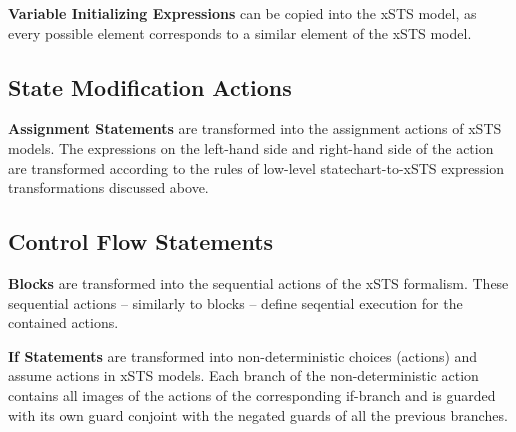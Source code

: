 \bigskip
\textbf{Variable Initializing Expressions} can be copied into the xSTS model, as every possible element corresponds to a similar element of the xSTS model.

\subsection{State Modification Actions}
\bigskip
\textbf{Assignment Statements} are transformed into the assignment actions of xSTS models. The expressions on the left-hand side and right-hand side of the action are transformed according to the rules of low-level statechart-to-xSTS expression transformations discussed above.

\subsection{Control Flow Statements}
\bigskip
\textbf{Blocks} are transformed into the sequential actions of the xSTS formalism. These sequential actions -- similarly to blocks -- define seqential execution for the contained actions. 


\bigskip
\textbf{If Statements} are transformed into non-deterministic choices (actions) and assume actions in xSTS models. Each branch of the non-deterministic action contains all images of the actions of the corresponding if-branch and is guarded with its own guard conjoint with the negated guards of all the previous branches.

